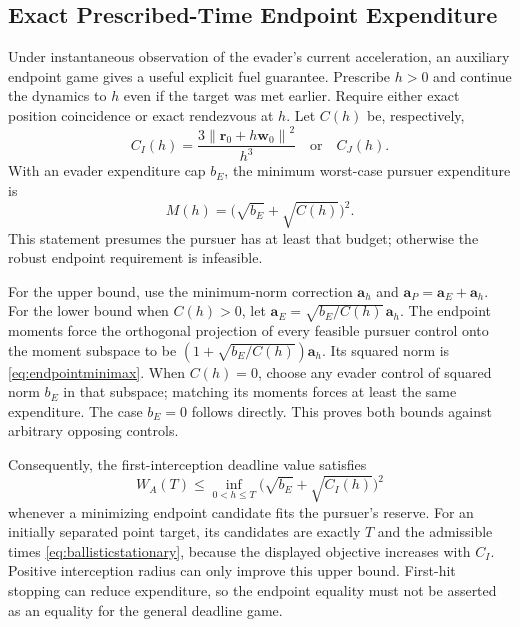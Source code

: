 \documentclass[journal,a4paper]{IEEEtran}
\newcommand{\norm}[1]{\left\|#1\right\|}
\begin{document}
\subsection{Exact Prescribed-Time Endpoint Expenditure}
Under instantaneous observation of the evader's current acceleration, an auxiliary endpoint game gives a useful explicit fuel guarantee. Prescribe $h>0$ and continue the dynamics to $h$ even if the target was met earlier. Require either exact position coincidence or exact rendezvous at $h$. Let $C(h)$ be, respectively,
\begin{equation}
 C_I(h)=\frac{3\norm{\mathbf r_0+h\mathbf w_0}^2}{h^3}
 \quad\text{or}\quad C_J(h).
\end{equation}
With an evader expenditure cap $b_E$, the minimum worst-case pursuer expenditure is
\begin{equation}
 \boxed{M(h)=\bigl(\sqrt{b_E}+\sqrt{C(h)}\bigr)^2.}
 \label{eq:endpointminimax}
\end{equation}
This statement presumes the pursuer has at least that budget; otherwise the robust endpoint requirement is infeasible.

For the upper bound, use the minimum-norm correction $\mathbf a_h$ and $\mathbf a_P=\mathbf a_E+\mathbf a_h$. For the lower bound when $C(h)>0$, let $\mathbf a_E=\sqrt{b_E/C(h)}\,\mathbf a_h$. The endpoint moments force the orthogonal projection of every feasible pursuer control onto the moment subspace to be $(1+\sqrt{b_E/C(h)})\mathbf a_h$. Its squared norm is \eqref{eq:endpointminimax}. When $C(h)=0$, choose any evader control of squared norm $b_E$ in that subspace; matching its moments forces at least the same expenditure. The case $b_E=0$ follows directly. This proves both bounds against arbitrary opposing controls.

Consequently, the first-interception deadline value satisfies
\begin{equation}
 W_A(T)\le\inf_{0<h\le T}
       \bigl(\sqrt{b_E}+\sqrt{C_I(h)}\bigr)^2
 \label{eq:deadlineupperexplicit}
\end{equation}
whenever a minimizing endpoint candidate fits the pursuer's reserve. For an initially separated point target, its candidates are exactly $T$ and the admissible times \eqref{eq:ballisticstationary}, because the displayed objective increases with $C_I$. Positive interception radius can only improve this upper bound. First-hit stopping can reduce expenditure, so the endpoint equality must not be asserted as an equality for the general deadline game.
\end{document}

